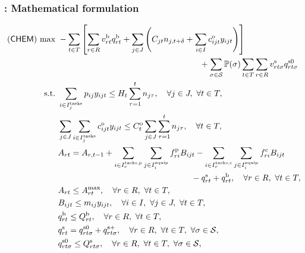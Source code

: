 \subsubsection{\chem: Mathematical formulation}

\begin{subequations} \label{chem:formulation}
	\begin{align}
	(\chem)\ \textrm{max}\ & -\sum_{t\in T}\left[ \sum_{r\in R}v_{rt}^\textrm{b}q_{rt}^\textrm{b} + \sum_{j\in J}\left( C_{jt}n_{j,t+\delta}+\sum_{i\in I}c_{ijt}^\textrm{o}y_{ijt} \right) \right] \nonumber \\ 
	&\qquad\qquad\qquad\qquad\qquad\qquad\qquad\qquad\quad+ \sum_{\sigma\in\mathcal{S}}\PP(\sigma)\sum_{t\in T}\sum_{r\in R} v_{rt\sigma}^{\textrm{s}}q_{rt\sigma}^{\textrm{s0}} \label{chem:obj}\\
	\textrm{s.t.}\ & \sum_{i\in I_j^{\textrm{tasks}}}p_{ij}y_{ijt}\le H_t\sum_{\tau=1}^{t}n_{j\tau},\quad\forall j\in J,\ \forall t\in T,\label{chem:b}\\
	&\sum_{j\in J}\sum_{i\in I_j^{\textrm{tasks}}}c_{ijt}^\textrm{o} y_{ijt} \le C_t^\textrm{o}\sum_{j\in J}\sum_{\tau=1}^{t}n_{j\tau},\quad\forall t\in T, \label{chem:c} \\
	&A_{rt}=A_{r,t-1}+\sum_{i\in I_r^{\textrm{tasks,p}}}\sum_{j\in I_i^\textrm{equip}}f_{ri}^\textrm{p}B_{ijt}-\sum_{i\in I_r^{\textrm{tasks,c}}}\sum_{j\in I_i^\textrm{equip}}f_{ri}^\textrm{c}B_{ijt}\nonumber\\
	&\qquad\qquad\qquad\qquad\qquad\qquad\qquad\quad\quad  -q_{rt}^\textrm{s}+q_{rt}^\textrm{b},\quad\forall r\in R,\ \forall t\in T,\label{chem:d}\\
	&A_{rt}\le A_{rt}^\textrm{max},\quad\forall r\in R,\ \forall t\in T,\label{chem:e}\\
	&B_{ijt}\le m_{ij}y_{ijt},\quad\forall i\in I,\ \forall j\in J,\ \forall t\in T,\label{chem:f}\\
	&q_{rt}^\textrm{b}\le Q_{rt}^\textrm{b},\quad\forall r\in R,\ \forall t\in T,\label{chem:i}\\
	&q_{rt}^\textrm{s}=q_{rt\sigma}^{\textrm{s0}}+q_{rt\sigma}^{\textrm{s+}},\quad\forall r\in R,\ \forall t\in T,\ \forall \sigma\in\mathcal{S},\label{chem:g}\\
	&q_{rt\sigma}^\textrm{s0}\le Q_{rt\sigma}^\textrm{s},\quad\forall r\in R,\ \forall t\in T,\ \forall \sigma\in\mathcal{S},\label{chem:h}\\

\end{align}
\end{subequations}
